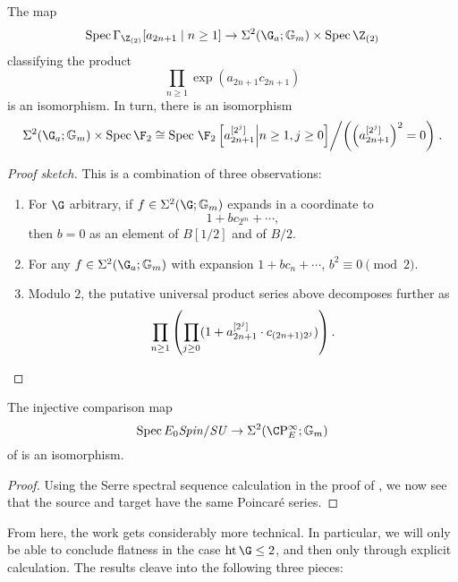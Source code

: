 \begin{lemma}
The map \[\Spec \Gamma_{\Z_{(2)}}[a_{2n + 1} \mid n \ge 1] \to \Sigma^2(\G_a; \Gm) \times \Spec \Z_{(2)}\] classifying the product \[\prod_{n \ge 1} \exp(a_{2n+1} c_{2n+1})\] is an isomorphism.  In turn, there is an isomorphism \[\Sigma^2(\G_a; \Gm) \times \Spec \F_2 \cong \Spec \left.\F_2\left[a_{2n+1}^{[2^j]} \middle| n \ge 1, j \ge 0\right] \middle/ \left(\left(a_{2n+1}^{[2^j]}\right)^2 = 0\right)\right. .\]
\end{lemma}
\begin{proof}[Proof sketch]
This is a combination of three observations:
\begin{enumerate}
    \item For \(\G\) arbitrary, if \(f \in \Sigma^2(\G; \Gm)\) expands in a coordinate to \[1 + b c_{2^m} + \cdots,\] then \(b = 0\) as an element of \(B[1/2]\) and of \(B/2\).
    \item For any \(f \in \Sigma^2(\G_a; \Gm)\) with expansion \(1 + b c_n + \cdots\), \(b^2 \equiv 0 \pmod{2}\).
    \item Modulo \(2\), the putative universal product series above decomposes further as \[\prod_{n \ge 1} \left(\prod_{j \ge 0} (1 + a_{2n+1}^{[2^j]} \cdot c_{(2n+1)2^j})\right). \qedhere\]
\end{enumerate}
\end{proof}

\begin{corollary}
The injective comparison map \[\Spec E_0 \Spin/\SU \to \Sigma^2(\CP^\infty_E; \Gm)\] of  is an isomorphism.
\end{corollary}
\begin{proof}
Using the Serre spectral sequence calculation in the proof of , we now see that the source and target have the same Poincar\'e series.
\end{proof}

From here, the work gets considerably more technical.  In particular, we will only be able to conclude flatness in the case \(\height \G \le 2\), and then only through explicit calculation.  The results cleave into the following three pieces:

